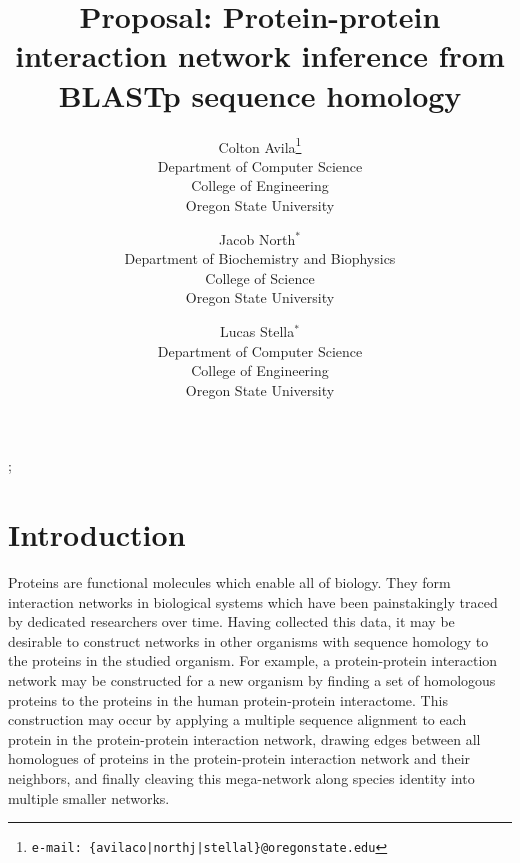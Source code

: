 \documentclass{acmsiggraph}               %
\title{Proposal: Protein-protein interaction network inference from BLASTp sequence homology}
\author{Colton Avila\thanks{\small\texttt{e-mail: \{avilaco|northj|stellal\}@oregonstate.edu}}\\Department of Computer Science\\College of Engineering\\ Oregon State University
\and Jacob North$^{\ast}$ \\
Department of Biochemistry and Biophysics\\College of Science\\Oregon State University
\and Lucas Stella$^{\ast}$ \\
Department of Computer Science\\College of Engineering\\Oregon State University}
\begin{document}

\maketitle



\copyrightspace





\begin{CRcatlist}
  ;
\end{CRcatlist}

\keywordlist


\section{Introduction}
\label{sec:intro}
Proteins are functional molecules which enable all of biology. They form interaction networks in biological systems which have been painstakingly traced by dedicated researchers over time. Having collected this data, it may be desirable to construct networks in other organisms with sequence homology to the proteins in the studied organism. For example, a protein-protein interaction network may be constructed for a new organism by finding a set of homologous proteins to the proteins in the human protein-protein interactome. This construction may occur by applying a multiple sequence alignment to each protein in the protein-protein interaction network, drawing edges between all homologues of proteins in the protein-protein interaction network and their neighbors, and finally cleaving this mega-network along species identity into multiple smaller networks.
\end{document}

